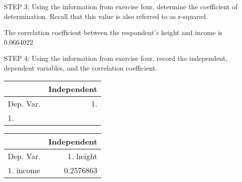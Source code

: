 \documentclass[11pt]{book}\usepackage[]{graphicx}\usepackage[]{color}
\begin{document}
\begin{exercises}
\begin{exercise}
    STEP 3: Using the information from exercise four, determine the coefficient of determination.  Recall that this value is also referred to as r-squared.

    \vspace{5mm}

    \end{exercise}
    \begin{solution}    %

       The correlation coefficient between the respondent's height and income is 0.0664022

    \end{solution}

  \begin{exercise} %

    STEP 4: Using the information from exercise four, record the independent, dependent variables, and the correlation coefficient.

{\scriptsize{
    \begin{table}[ht]
    \centering
    \begin{tabular}{lr} \hline
        &  \multicolumn{1}{c}{Independent} \\ \hline

    Dep. Var. & 1. \underline{\phantom{xxxxxxxx}}      \\ \hline
    1. \underline{\phantom{xxxxxxxx}}  &  \underline{\phantom{xxxxxxxx}}       \\ \hline

    \end{tabular}
    \end{table}
}}


    \end{exercise}
    \begin{solution}    %

       \begin{table}[ht]
    \centering
    \begin{tabular}{lr} \hline
        &  \multicolumn{1}{c}{Independent} \\ \hline

    Dep. Var. & 1. height      \\ \hline
    1. income  &   0.2576863      \\ \hline

    \end{tabular}
    \end{table}


\end{solution}
\end{exercises}
\end{document}
